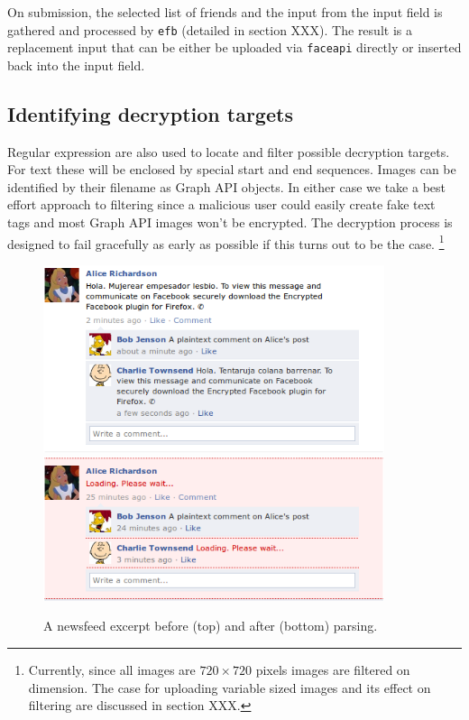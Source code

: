 On submission, the selected list of friends and the input from the input field is gathered and processed by {\tt efb} (detailed in section XXX). The result is a replacement input that can be either be uploaded via {\tt faceapi} directly or inserted back into the input field.

\subsection{Identifying decryption targets}

Regular expression are also used to locate and filter possible decryption targets. For text these will be enclosed by special start and end sequences. Images can be identified by their filename as Graph API objects. In either case we take a best effort approach to filtering since a malicious user could easily create fake text tags and most Graph API images won't be encrypted. The decryption process is designed to fail gracefully as early as possible if this turns out to be the case. \footnote{Currently, since all images are $720 \times 720$ pixels images are filtered on dimension. The case for uploading variable sized images and its effect on filtering are discussed in section XXX.}

    \begin{figure}[tbph]
        \begin{center}
                \includegraphics[width=10cm]{screens/content1.png}
                \includegraphics[width=10cm]{screens/content4.png}
            \caption{A newsfeed excerpt before (top) and after (bottom) parsing.}
            \label{scn:ctrl}
        \end{center}
    \end{figure}
    
